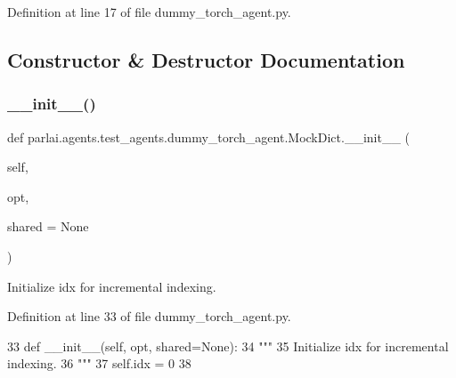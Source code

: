 Definition at line 17 of file dummy\+\_\+torch\+\_\+agent.\+py.



\subsection{Constructor \& Destructor Documentation}
\mbox{\label{classparlai_1_1agents_1_1test__agents_1_1dummy__torch__agent_1_1MockDict_ac1430e2d948a25733e5302222479a351}} 
\subsubsection{\texorpdfstring{\+\_\+\+\_\+init\+\_\+\+\_\+()}{\_\_init\_\_()}}
{\footnotesize\ttfamily def parlai.\+agents.\+test\+\_\+agents.\+dummy\+\_\+torch\+\_\+agent.\+Mock\+Dict.\+\_\+\+\_\+init\+\_\+\+\_\+ (\begin{DoxyParamCaption}\item[{}]{self,  }\item[{}]{opt,  }\item[{}]{shared = {\ttfamily None} }\end{DoxyParamCaption})}

\begin{DoxyVerb}Initialize idx for incremental indexing.
\end{DoxyVerb}
 

Definition at line 33 of file dummy\+\_\+torch\+\_\+agent.\+py.


\begin{DoxyCode}
33     \textcolor{keyword}{def }\_\_init\_\_(self, opt, shared=None):
34         \textcolor{stringliteral}{"""}
35 \textcolor{stringliteral}{        Initialize idx for incremental indexing.}
36 \textcolor{stringliteral}{        """}
37         self.idx = 0
38 
\end{DoxyCode}


